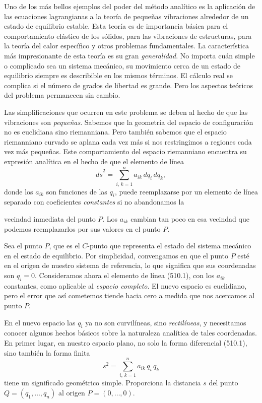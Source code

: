\documentclass[12pt,a4paper]{book}
\begin{document}
Uno de los más bellos ejemplos del poder del método analítico es la aplicación de las ecuaciones lagrangianas a la teoría de pequeñas vibraciones alrededor de un estado de equilibrio estable. Esta teoría es de importancia básica para el comportamiento elástico de los sólidos, para las vibraciones de estructuras, para la teoría del calor específico y otros problemas fundamentales. La característica más impresionante de esta teoría es su gran \textit{generalidad}. No importa cuán simple o complicado sea un sistema mecánico, su movimiento cerca de un estado de equilibrio siempre es describible en los mismos términos. El cálculo real se complica si el número de grados de libertad es grande. Pero los aspectos teóricos del problema permanecen sin cambio.

Las simplificaciones que ocurren en este problema se deben al hecho de que las vibraciones son \textit{pequeñas}. Sabemos que la geometría del espacio de configuración no es euclidiana sino riemanniana. Pero también sabemos que el espacio riemanniano curvado se aplana cada vez más si nos restringimos a regiones cada vez más pequeñas. Este comportamiento del espacio riemanniano encuentra su expresión analítica en el hecho de que el elemento de línea
\begin{equation}
\overline{ds}^2 = \sum_{i,\,k=1}^{n} a_{ik}\,dq_i\,dq_k, \tag{510.1}
\end{equation}
donde los $a_{ik}$ son funciones de las $q_i$, puede reemplazarse por un elemento de línea separado con coeficientes \textit{constantes} si no abandonamos la


vecindad inmediata del punto $P$. Los $a_{ik}$ cambian tan poco en esa vecindad que podemos reemplazarlos por sus valores en el punto $P$.

Sea el punto $P$, que es el $C$-punto que representa el estado del sistema mecánico en el estado de equilibrio. Por simplicidad, convengamos en que el punto $P$ esté en el origen de nuestro sistema de referencia, lo que significa que sus coordenadas son $q_i = 0$. Consideramos ahora el elemento de línea (510.1), con los $a_{ik}$ constantes, como aplicable al \textit{espacio completo}. El nuevo espacio es euclidiano, pero el error que así cometemos tiende hacia cero a medida que nos acercamos al punto $P$.

En el nuevo espacio las $q_i$ ya no son curvilíneas, sino \textit{rectilíneas}, y necesitamos conocer algunos hechos básicos sobre la naturaleza analítica de tales coordenadas. En primer lugar, en nuestro espacio plano, no solo la forma diferencial (510.1), sino también la forma finita
\begin{equation}
s^2 = \sum_{i,\,k=1}^{n} a_{ik}\,q_i\,q_k \tag{510.2}
\end{equation}
tiene un significado geométrico simple. Proporciona la distancia $s$ del punto $Q = (q_1, \ldots, q_n)$ al origen $P = (0, \ldots, 0)$.
\end{document}

